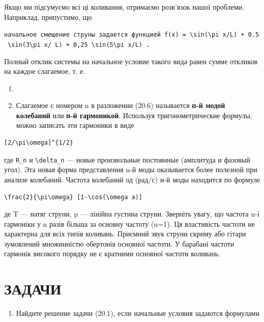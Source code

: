 \documentclass[
  ukrainian,
]{article}
\providecommand{\tightlist}{%
  \setlength{\itemsep}{0pt}\setlength{\parskip}{0pt}}
\begin{document}
Якщо ми підсумуємо всі ці коливання, отримаємо розв'язок нашої проблеми.
Наприклад, припустимо, що

\texttt{начальное\ смещение\ струны\ задается\ функцией\ \textquotesingle{}f(x)\ =\ \textbackslash{}sin(\textbackslash{}pi\ x/L)\ +\ 0.5\ \textbackslash{}sin(3\textbackslash{}pi\ x/\ L)\ +\ 0,25\ \textbackslash{}sin(5\textbackslash{}pi\ x/L)\textquotesingle{}\ .}

Полный отклик системы на начальное условие такого вида равен сумме
откликов на каждое слагаемое, т. е.

\begin{enumerate}
\def\labelenumi{\arabic{enumi}.}
\setcounter{enumi}{3}
\tightlist
\item
\item
  Слагаемое с номером n в разложении (20.6) называется \textbf{п-й модой
  колебаний} или \textbf{п-й гармоникой}. Используя тригонометрические
  формулы, можно записать эти гармоники в виде
\end{enumerate}

\begin{verbatim}
[2/\pi\omega]^{1/2}
\end{verbatim}

где \texttt{R\_n} и \texttt{\textbackslash{}delta\_n} --- новые
произвольные постоянные (амплитуда и фазовый угол). Эта новая форма
представления n-й моды оказывается более полезной при анализе колебаний.
Частота колебаний од (рад/с) и-й моды находится по формуле

\begin{verbatim}
\frac{2}{\pi\omega} [1-\cos(\omega a)]
\end{verbatim}

де T --- натяг струни, p --- лінійна густина струни. Зверніть увагу, що
частота n-ї гармоніки у n разів більша за основну частоту (n=1). Ця
властивість частоти не характерна для всіх типів коливань. Приємний звук
струни скриму або гітари зумовлений множинністю обертонів основної
частоти. У барабані частоти гармонік високого порядку не є кратними
основної частоти коливань.

\section{ЗАДАЧИ}\label{ux437ux430ux434ux430ux447ux438-1}

\begin{enumerate}
\def\labelenumi{\arabic{enumi}.}
\tightlist
\item
  Найдите решение задачи (20.1), если начальные условия задаются
  формулами
\end{enumerate}
\end{document}
